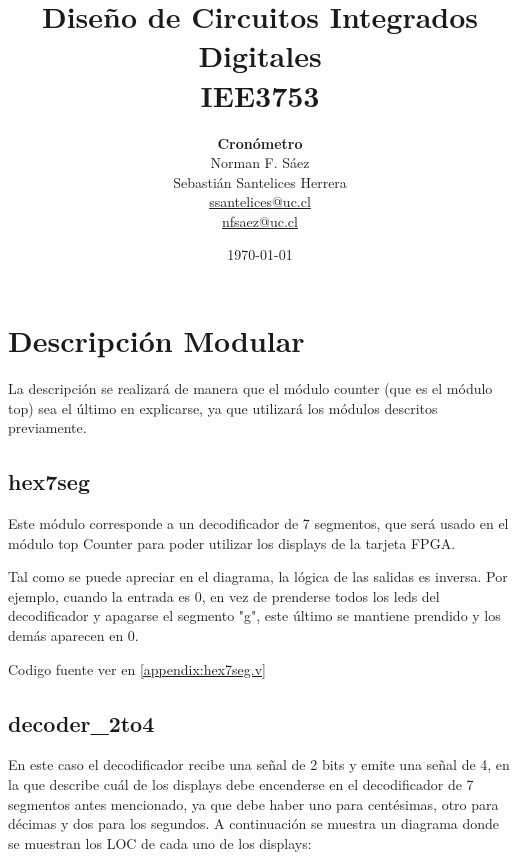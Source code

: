 \documentclass[a4paper,10pt]{article}
\title{Diseño de Circuitos Integrados Digitales\\IEE3753}
\author{\textbf{Cronómetro}\\Norman F. Sáez\\Sebastián Santelices Herrera\\\url{ssantelices@uc.cl}\\\url{nfsaez@uc.cl}}
\date{\today}
\begin{document}
\maketitle
\newpage
\tableofcontents
\newpage
\section{Descripción Modular}
La descripción se realizará de manera que el módulo counter
(que es el módulo top) sea el último en explicarse, ya que utilizará los
módulos descritos previamente.  \subsection{hex7seg} Este módulo corresponde a
un decodificador de 7 segmentos, que será usado en el módulo top Counter para
poder utilizar los displays de la tarjeta FPGA. 


Tal como se puede apreciar en el diagrama, la lógica de las salidas es inversa.
Por ejemplo, cuando la entrada es 0, en vez de prenderse todos los leds del
decodificador y apagarse el segmento "g", este último se mantiene prendido y
los demás aparecen en 0.

Codigo fuente ver en \ref{appendix:hex7seg.v}


\subsection{decoder\_2to4}

En este caso el decodificador recibe una señal de 2 bits y emite una señal de
4, en la que describe cuál de los displays debe encenderse en el decodificador
de 7 segmentos antes mencionado, ya que debe haber uno para centésimas, otro
para décimas y dos para los segundos. A continuación se muestra un diagrama
donde se muestran los LOC de cada uno de los displays:
\end{document}

